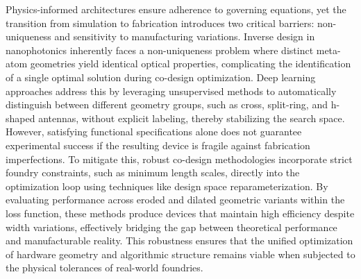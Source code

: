 Physics-informed architectures ensure adherence to governing equations, yet the transition from simulation to fabrication introduces two critical barriers: non-uniqueness and sensitivity to manufacturing variations. Inverse design in nanophotonics inherently faces a non-uniqueness problem where distinct meta-atom geometries yield identical optical properties, complicating the identification of a single optimal solution during co-design optimization. Deep learning approaches address this by leveraging unsupervised methods to automatically distinguish between different geometry groups, such as cross, split-ring, and h-shaped antennas, without explicit labeling, thereby stabilizing the search space. However, satisfying functional specifications alone does not guarantee experimental success if the resulting device is fragile against fabrication imperfections. To mitigate this, robust co-design methodologies incorporate strict foundry constraints, such as minimum length scales, directly into the optimization loop using techniques like design space reparameterization. \citep{doi_10_1021_acsphotonics_2c00313_0d7d39c3} By evaluating performance across eroded and dilated geometric variants within the loss function, these methods produce devices that maintain high efficiency despite width variations, effectively bridging the gap between theoretical performance and manufacturable reality. This robustness ensures that the unified optimization of hardware geometry and algorithmic structure remains viable when subjected to the physical tolerances of real-world foundries. \citep{doi_10_1515_nanoph_2019_0474_d2187501} \citep{doi_10_1021_acsphotonics_0c01202_d9ad1299} \citep{doi_10_1021_acsphotonics_2c00313_0d7d39c3}

